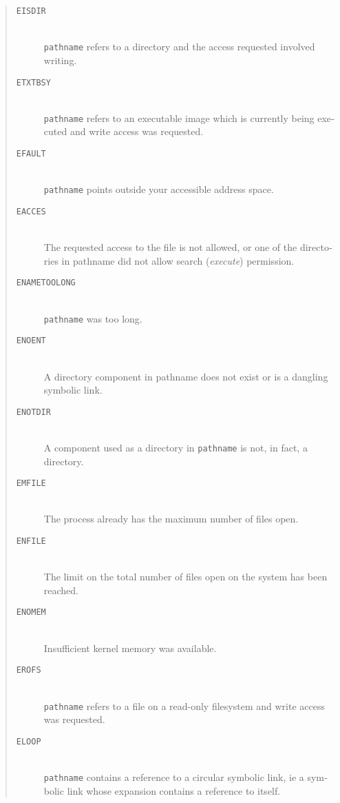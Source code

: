 \begin{appendix}
\begin{english}
\begin{quote}
\begin{description}
	\item[{\tt EISDIR}]\mbox{}\\
		{\tt pathname} refers to a directory and the access
		requested involved writing.

	\item[{\tt ETXTBSY}]\mbox{}\\
		{\tt pathname} refers to an executable image which is
		currently being executed and write access was requested.

	\item[{\tt EFAULT}]\mbox{}\\
		{\tt pathname} points outside your accessible address space.

	\item[{\tt EACCES}]\mbox{}\\
		The requested access to the file is not allowed, or one of the
		directories in pathname did not allow search ({\sl execute})
permission.

	\item[{\tt ENAMETOOLONG}]\mbox{}\\
		{\tt pathname} was too long.

	\item[{\tt ENOENT}]\mbox{}\\
		A directory component in pathname does not exist or is a dangling
		symbolic link.

	\item[{\tt ENOTDIR}]\mbox{}\\
		A component used as a directory in {\tt pathname} is not, in fact,
		a directory.

	\item[{\tt EMFILE}]\mbox{}\\
		The process already has the maximum number of files open.

	\item[{\tt ENFILE}]\mbox{}\\
		The limit on the total number of files open on the system has
		been reached.

	\item[{\tt ENOMEM}]\mbox{}\\
		Insufficient kernel memory was available.

	\item[{\tt EROFS}]\mbox{}\\
		{\tt pathname} refers to a file on a read-only filesystem and
		write access was requested.

	\item[{\tt ELOOP}]\mbox{}\\
		{\tt pathname} contains a reference to a circular symbolic
		link, ie a symbolic link whose expansion contains a reference to itself.


\end{description}
\end{quote}
\end{english}
\end{appendix}
